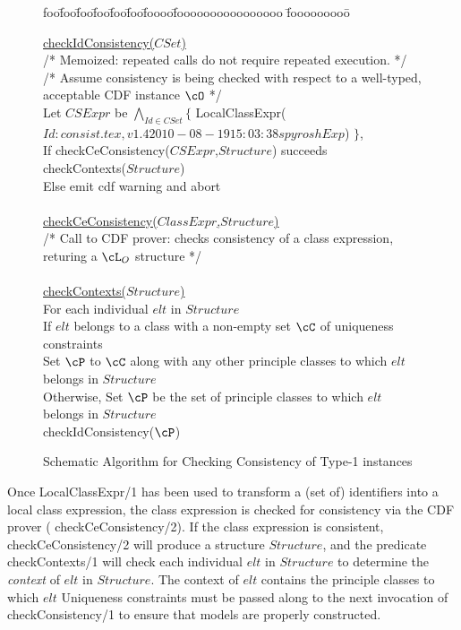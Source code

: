 \begin{figure}[htbp]
\longline
{\sf
\begin{tabbing}
foo\=foo\=foo\=foo\=foo\=foo\=foooo\=foooooooooooooooo \=fooooooooo\=\kill

\> \underline{checkIdConsistency($CSet$)}  \\
\> \> 	{\rm /* Memoized: repeated calls do
		not require repeated execution.  */ }\\
\> \> 	{\rm /* Assume consistency is being checked with respect to a
		well-typed, acceptable CDF instance $\cO$ */} \\
\> \> 	Let $CSExpr$ be $\bigwedge_{Id \in CSet} \{$ 
			LocalClassExpr($Id: consist.tex,v 1.4 2010-08-19 15:03:38 spyrosh Exp $) $\}$,  \\
\> \> 	If checkCeConsistency($CSExpr$,$Structure$) succeeds  \\
\> \> \> 	    checkContexts($Structure$) \\
\> \>     Else emit cdf warning and abort \\
\\
\> \underline{checkCeConsistency($ClassExpr$,$Structure$)} \\
\> \> {\rm /*  Call to CDF prover: checks consistency of a class
	         expression, returing a $\cL_O$ structure */} \\
\\
\> \underline{checkContexts($Structure$)}  \\
\> \> For each individual $elt$ in $Structure$ \\
\> \> \> If $elt$ belongs to a class with a non-empty set $\cC$ of
			uniqueness constraints \\
\> \> \> \> Set $\cP$ to $\cC$ along with any other principle classes to
		which  $elt$ belongs in $Structure$ \\ 
\> \> \> Otherwise, Set $\cP$ be the set of 
		principle classes to which $elt$ belongs in $Structure$ \\ 
\> \> \> checkIdConsistency($\cP$) \\
\end{tabbing}
}
\caption{Schematic Algorithm for Checking Consistency of Type-1 instances}
\label{fig:type1cc}
\longline
\end{figure}

Once {\sf LocalClassExpr/1} has been used to transform a (set of)
identifiers into a local class expression, the class expression is
checked for consistency via the CDF prover ({\sf
checkCeConsistency/2}).  If the class expression is consistent, {\sf
checkCeConsistency/2} will produce a structure $Structure$, and the
predicate {\sf checkContexts/1} will check each individual $elt$ in
$Structure$ to determine the {\em context} of $elt$ in $Structure$.
The context of $elt$ contains the principle classes to which $elt$
Uniqueness constraints must be passed along to the next invocation of
{\sf checkConsistency/1} to ensure that models are properly
constructed.

